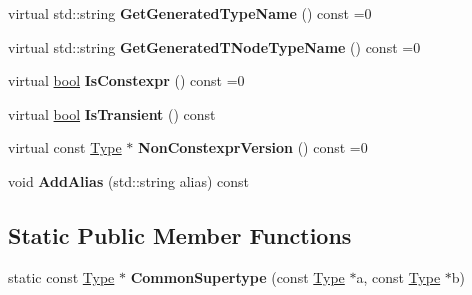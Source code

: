 \begin{DoxyCompactItemize}
\item 
\mbox{\label{classv8_1_1internal_1_1torque_1_1Type_ad651a462ac517cea1b48bbe739827683}} 
virtual std\+::string {\bfseries Get\+Generated\+Type\+Name} () const =0
\item 
\mbox{\label{classv8_1_1internal_1_1torque_1_1Type_a916a52cef7e51db20c46f3c8fccff07c}} 
virtual std\+::string {\bfseries Get\+Generated\+T\+Node\+Type\+Name} () const =0
\item 
\mbox{\label{classv8_1_1internal_1_1torque_1_1Type_a1804be8c9901d72a43d087549b597aa9}} 
virtual \mbox{\hyperlink{classbool}{bool}} {\bfseries Is\+Constexpr} () const =0
\item 
\mbox{\label{classv8_1_1internal_1_1torque_1_1Type_a27a48119b18f361f24732870800da51f}} 
virtual \mbox{\hyperlink{classbool}{bool}} {\bfseries Is\+Transient} () const
\item 
\mbox{\label{classv8_1_1internal_1_1torque_1_1Type_a73838e387ba32885acc9dea5c5d5cb1c}} 
virtual const \mbox{\hyperlink{classv8_1_1internal_1_1torque_1_1Type}{Type}} $\ast$ {\bfseries Non\+Constexpr\+Version} () const =0
\item 
\mbox{\label{classv8_1_1internal_1_1torque_1_1Type_ac0f37e025954e4ba239547a964f9e4cc}} 
void {\bfseries Add\+Alias} (std\+::string alias) const
\end{DoxyCompactItemize}
\subsection*{Static Public Member Functions}
\begin{DoxyCompactItemize}
\item 
\mbox{\label{classv8_1_1internal_1_1torque_1_1Type_acf426ccf2d8153eeac4b5958a0d22afa}} 
static const \mbox{\hyperlink{classv8_1_1internal_1_1torque_1_1Type}{Type}} $\ast$ {\bfseries Common\+Supertype} (const \mbox{\hyperlink{classv8_1_1internal_1_1torque_1_1Type}{Type}} $\ast$a, const \mbox{\hyperlink{classv8_1_1internal_1_1torque_1_1Type}{Type}} $\ast$b)
\end{DoxyCompactItemize}
